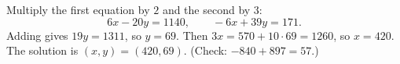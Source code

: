 Multiply the first equation by $2$ and the second by $3$:
\[6x-20y=1140,\qquad-6x+39y=171.\]
Adding gives $19y=1311$, so $y=69$. Then $3x=570+10\cdot69=1260$, so $x=420$. The solution is $\boxed{(x,y)=(420,69)}$. (Check: $-840+897=57$.)
